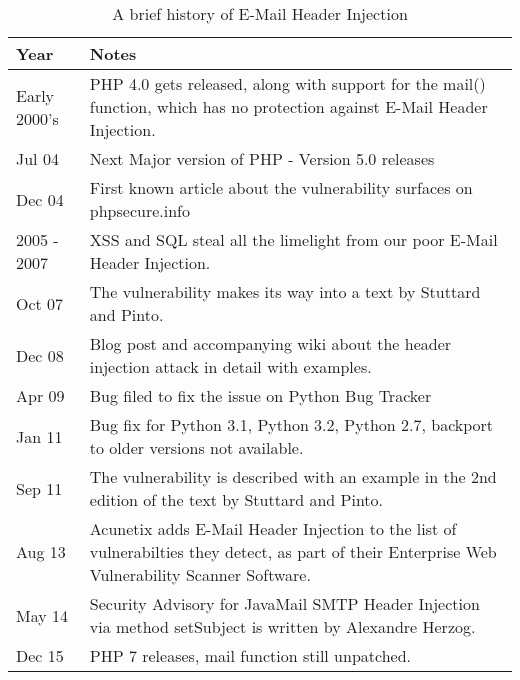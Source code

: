 \begin{table}[!htbp]
	\centering
	\begin{tabular}{|p{2cm}|p{12cm}|}
		\hline
		{Year} & { Notes}\\
		\hline

		{Early 2000's } & { PHP 4.0 gets released, along with support for the mail() function, which has no protection against E-Mail Header Injection.}\\
		\hline

		{Jul 04} & { Next Major version of PHP - Version 5.0 releases}\\
		\hline

		{Dec 04} & { First known article about the vulnerability surfaces on phpsecure.info}\\
		\hline

		{2005 - 2007} & {XSS and SQL steal all the limelight from our poor E-Mail Header Injection.}\\
		\hline

		{Oct 07} & {The vulnerability makes its way into a text by Stuttard and Pinto. }\\
		\hline

		{Dec 08} & {Blog post and accompanying wiki about the header injection attack in detail with examples.}\\
		\hline

		{Apr 09} & {Bug filed to fix the issue on Python Bug Tracker}\\
		\hline

		{Jan 11} & {Bug fix for Python 3.1, Python 3.2, Python 2.7, backport to older versions not available.}\\
		\hline

		{Sep 11} & {The vulnerability is described with an example in the 2nd edition of the text by Stuttard and Pinto.}\\
		\hline

		{Aug 13} & {Acunetix adds E-Mail Header Injection to the list of vulnerabilties they detect, as part of their Enterprise Web Vulnerability Scanner Software.}\\
		\hline

		{May 14} & {Security Advisory for JavaMail SMTP Header Injection via method setSubject is written by Alexandre Herzog.}\\
		\hline

		{Dec 15}  & {PHP 7 releases, mail function still unpatched.}\\
		\hline
	\end{tabular}
	\caption{A brief history of E-Mail Header Injection}
	\label{tab:history}
\end{table}
